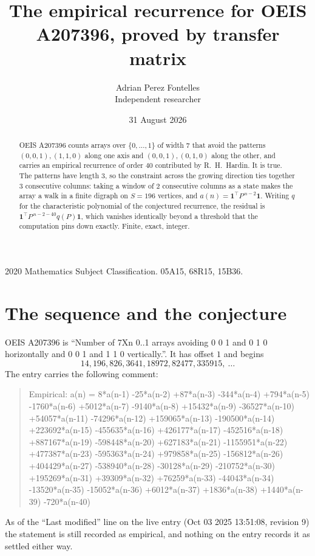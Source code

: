 \documentclass[11pt,a4paper]{article}
\title{The empirical recurrence for OEIS A207396, proved by transfer matrix}
\author{Adrian Perez Fontelles\\ \small Independent researcher}
\date{31 August 2026}
\theoremstyle{plain}
\theoremstyle{definition}
\begin{document}
\maketitle

\begin{abstract}
OEIS A207396 counts arrays over $\{0,\dots,1\}$ of width $7$ that avoid the patterns
$(0,0,1), (1,1,0)$ along one axis and $(0,0,1), (0,1,0)$ along the other, and carries an empirical recurrence of
order $40$ contributed by R.~H.~Hardin. It is true. The patterns have length $3$, so
the constraint across the growing direction ties together $3$ consecutive columns: taking a
window of $2$ consecutive columns as a state makes the array a walk in a finite digraph
on $S=196$ vertices, and $a(n)=\mathbf{1}^{\!\top}P^{\,n-2}\mathbf{1}$. Writing $q$
for the characteristic polynomial of the conjectured recurrence, the residual is
$\mathbf{1}^{\!\top}P^{\,n-2-40}q(P)\mathbf{1}$, which vanishes identically
beyond a threshold that the computation pins down exactly. Finite, exact, integer.
\end{abstract}

\noindent\small 2020 Mathematics Subject Classification. 05A15, 68R15, 15B36.\normalsize

\section{The sequence and the conjecture}

OEIS A207396 is ``Number of 7Xn 0..1 arrays avoiding 0 0 1 and 0 1 0 horizontally and 0 0 1 and 1 1 0 vertically.''. It has offset
$1$ and begins
\[
14, 196, 826, 3641, 18972, 82477, 335915,\ \dots
\]
The entry carries the following comment:
\begin{quote}\small
Empirical: a(n) = 8*a(n-1) -25*a(n-2) +87*a(n-3) -344*a(n-4) +794*a(n-5) -1760*a(n-6) +5012*a(n-7) -9140*a(n-8) +15432*a(n-9) -36527*a(n-10) +54057*a(n-11) -74296*a(n-12) +159065*a(n-13) -190500*a(n-14) +223692*a(n-15) -455635*a(n-16) +426177*a(n-17) -452516*a(n-18) +887167*a(n-19) -598448*a(n-20) +627183*a(n-21) -1155951*a(n-22) +477387*a(n-23) -595363*a(n-24) +979858*a(n-25) -156812*a(n-26) +404429*a(n-27) -538940*a(n-28) -30128*a(n-29) -210752*a(n-30) +195269*a(n-31) +39309*a(n-32) +76259*a(n-33) -44043*a(n-34) -13520*a(n-35) -15052*a(n-36) +6012*a(n-37) +1836*a(n-38) +1440*a(n-39) -720*a(n-40)
\end{quote}
As of the ``Last modified'' line on the live entry (Oct 03 2025 13:51:08, revision
9) the statement is still recorded as empirical, and nothing on the entry
records it as settled either way.
\end{document}
